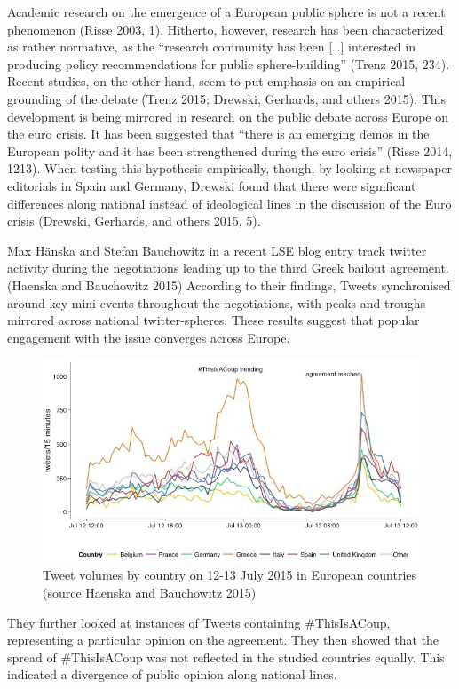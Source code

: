 \documentclass[]{article}
\begin{document}
Academic research on the emergence of a European public sphere is not a
recent phenomenon (Risse 2003, 1). Hitherto, however, research has been
characterized as rather normative, as the ``research community has been
{[}\ldots{}{]} interested in producing policy recommendations for public
sphere-building'' (Trenz 2015, 234). Recent studies, on the other hand,
seem to put emphasis on an empirical grounding of the debate (Trenz
2015; Drewski, Gerhards, and others 2015). This development is being
mirrored in research on the public debate across Europe on the euro
crisis. It has been suggested that ``there is an emerging demos in the
European polity and it has been strengthened during the euro crisis''
(Risse 2014, 1213). When testing this hypothesis empirically, though, by
looking at newspaper editorials in Spain and Germany, Drewski found that
there were significant differences along national instead of ideological
lines in the discussion of the Euro crisis (Drewski, Gerhards, and
others 2015, 5).

Max Hänska and Stefan Bauchowitz in a recent LSE blog entry track
twitter activity during the negotiations leading up to the third Greek
bailout agreement. (Haenska and Bauchowitz 2015) According to their
findings, Tweets synchronised around key mini-events throughout the
negotiations, with peaks and troughs mirrored across national
twitter-spheres. These results suggest that popular engagement with the
issue converges across Europe.

\begin{figure}[htbp]
\centering
\includegraphics{../../img/Greece-twitter-1.jpg}
\caption{Tweet volumes by country on 12-13 July 2015 in European
countries (source Haenska and Bauchowitz 2015)}
\end{figure}

They further looked at instances of Tweets containing \#ThisIsACoup,
representing a particular opinion on the agreement. They then showed
that the spread of \#ThisIsACoup was not reflected in the studied
countries equally. This indicated a divergence of public opinion along
national lines.
\end{document}
